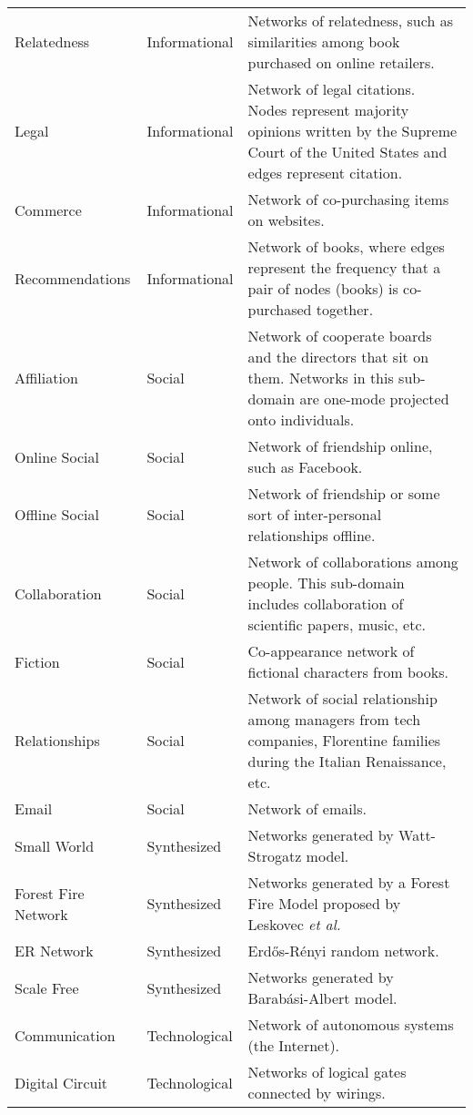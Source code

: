 \begin{longtable*}{| l | l | p{9cm} |}
      Relatedness &  Informational & Networks of relatedness, such as similarities among book purchased on online retailers. \\ %
      Legal &  Informational & Network of legal citations. Nodes represent majority opinions written by the Supreme Court of the United States and edges represent citation.\\ %
      Commerce &  Informational & Network of co-purchasing items on websites.\\  %
      Recommendations &  Informational & Network of books, where edges represent the frequency that a pair of nodes (books) is co-purchased together.\\  %
      Affiliation &  Social & Network of cooperate boards and the directors that sit on them. Networks in this sub-domain are one-mode projected onto individuals.\\  %
      Online Social &  Social & Network of friendship online, such as Facebook.\\  %
      Offline Social &  Social & Network of friendship or some sort of inter-personal relationships offline.\\  %
      Collaboration &  Social & Network of collaborations among people. This sub-domain includes collaboration of scientific papers, music, etc.\\  %
      Fiction &  Social & Co-appearance network of fictional characters from books.\\  %
      Relationships &  Social & Network of social relationship among managers from tech companies, Florentine families during the Italian Renaissance, etc.\\ %
      Email &  Social & Network of emails.\\ %
      Small World &  Synthesized & Networks generated by Watt-Strogatz model.\\  %
      Forest Fire Network &  Synthesized & Networks generated by a Forest Fire Model proposed by Leskovec \textit{et al.} \\  %
      ER Network &  Synthesized & Erd\H{o}s-R\'enyi random network. \\  %
      Scale Free &  Synthesized & Networks generated by Barab\'asi-Albert model.\\  %
      Communication &  Technological & Network of autonomous systems (the Internet).\\  %
      Digital Circuit &  Technological & Networks of logical gates connected by wirings.\\ %

\end{longtable*}
